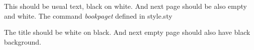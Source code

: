 \documentclass{kapital}
\begin{document}
    This should be usual text, black on white. And next page should be also 
    empty and white.
    The command \emph{bookpaget} defined in style.sty

    
    The title should be white on black. And next empty page should also have
    black background.
\end{document}
